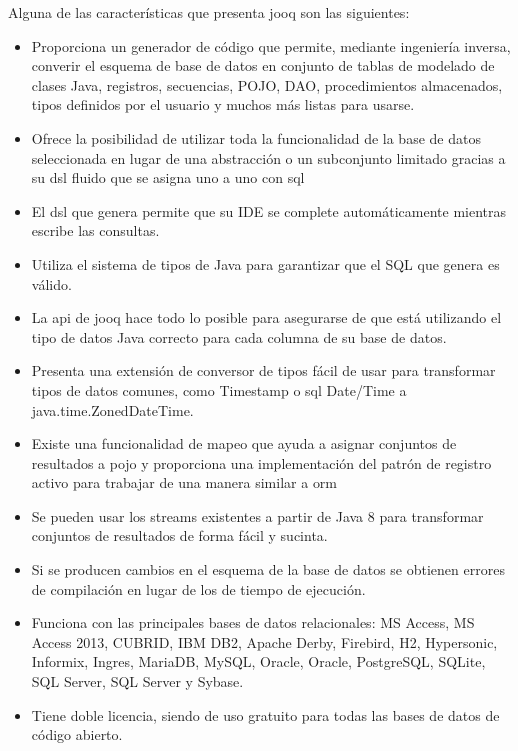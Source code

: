 {Alguna de las características que presenta \acrshort{jooq} son las siguientes\citep{VentajasJooq}:
\begin{itemize}
\item Proporciona un generador de código que permite, mediante ingeniería inversa, converir el esquema de base de datos en conjunto de tablas de modelado de clases Java, registros, secuencias, POJO, DAO, procedimientos almacenados, tipos definidos por el usuario y muchos más listas para usarse. 
\item Ofrece la posibilidad de utilizar toda la funcionalidad de la base de datos seleccionada en lugar de una abstracción o un subconjunto limitado gracias a su \acrfull{dsl} fluido que se asigna uno a uno con \acrshort{sql}
\item El \acrfull{dsl} que genera permite que su IDE se complete automáticamente mientras escribe las consultas.
\item Utiliza el sistema de tipos de Java para garantizar que el SQL que genera es válido.
\item La \acrshort{api} de \acrshort{jooq} hace todo lo posible para asegurarse de que está utilizando el tipo de datos Java correcto para cada columna de su base de datos. 
\item Presenta una extensión de conversor de tipos fácil de usar para transformar tipos de datos comunes, como Timestamp o \acrshort{sql} Date/Time a java.time.ZonedDateTime.
\item Existe una funcionalidad de mapeo que ayuda a asignar conjuntos de resultados a \acrfull{pojo} y proporciona una implementación del patrón de registro activo para trabajar de una manera similar a \acrshort{orm}
\item Se pueden usar los streams existentes a partir de Java 8 para transformar conjuntos de resultados de forma fácil y sucinta.
\item Si se producen cambios en el esquema de la base de datos se obtienen errores de compilación en lugar de los de tiempo de ejecución.
\item Funciona con las principales bases de datos relacionales: MS Access, MS Access 2013, CUBRID, IBM DB2, Apache Derby, Firebird, H2, Hypersonic, Informix, Ingres, MariaDB, MySQL, Oracle, Oracle, PostgreSQL, SQLite, SQL Server, SQL Server y Sybase.
\item Tiene doble licencia, siendo de uso gratuito para todas las bases de datos de código abierto.
\end{itemize}

}
